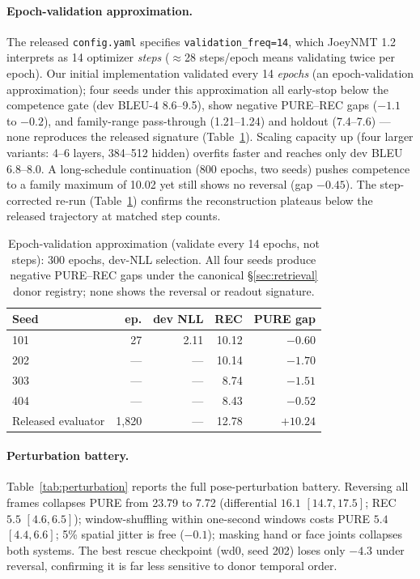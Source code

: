 \documentclass[pdflatex,sn-chicago]{sn-jnl}
\begin{document}
\paragraph{Epoch-validation approximation.}
The released \texttt{config.yaml} specifies \texttt{validation\_freq=14}, which JoeyNMT 1.2 interprets as 14 optimizer \emph{steps} ($\approx$28 steps/epoch means validating twice per epoch). Our initial implementation validated every 14 \emph{epochs} (an epoch-validation approximation); four seeds under this approximation all early-stop below the competence gate (dev BLEU-4 8.6--9.5), show negative PURE--REC gaps ($-1.1$ to $-0.2$), and family-range pass-through (1.21--1.24) and holdout (7.4--7.6) --- none reproduces the released signature (Table~\ref{tab:config_faithful}). Scaling capacity up (four larger variants: 4--6 layers, 384--512 hidden) overfits faster and reaches only dev BLEU 6.8--8.0. A long-schedule continuation (800 epochs, two seeds) pushes competence to a family maximum of 10.02 yet still shows no reversal (gap $-0.45$). The step-corrected re-run (Table~\ref{tab:config_faithful}) confirms the reconstruction plateaus below the released trajectory at matched step counts.

\begin{table}[h]
\centering
\scriptsize\setlength{\tabcolsep}{3pt}
\caption{Epoch-validation approximation (validate every 14 epochs, not steps): 300 epochs, dev-NLL selection. All four seeds produce negative PURE--REC gaps under the canonical \S\ref{sec:retrieval} donor registry; none shows the reversal or readout signature.}
\label{tab:config_faithful}
\begin{tabular}{lrrrr}
\toprule
Seed & ep. & dev NLL & REC & PURE gap \\
\midrule
101 & 27 & 2.11 & 10.12 & $-0.60$ \\
202 & --- & --- & 10.14 & $-1.70$ \\
303 & --- & --- & 8.74 & $-1.51$ \\
404 & --- & --- & 8.43 & $-0.52$ \\
\midrule
Released evaluator & 1{,}820 & --- & 12.78 & $+10.24$ \\
\bottomrule
\end{tabular}
\end{table}

\paragraph{Perturbation battery.}
\label{sec:appendix_perturbation}
Table~\ref{tab:perturbation} reports the full pose-perturbation battery. Reversing all frames collapses PURE from 23.79 to 7.72 (differential $16.1$ $[14.7,17.5]$; REC $5.5$ $[4.6,6.5]$); window-shuffling within one-second windows costs PURE $5.4$ $[4.4,6.6]$; 5\% spatial jitter is free ($-0.1$); masking hand or face joints collapses both systems. The best rescue checkpoint (wd0, seed 202) loses only $-4.3$ under reversal, confirming it is far less sensitive to donor temporal order.
\end{document}
